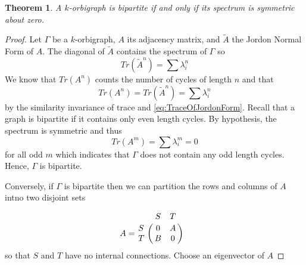 \documentclass[12pt]{article}
\theoremstyle{plain}
\newtheorem{theorem}{Theorem}
\theoremstyle{definition}
\theoremstyle{remark}
\begin{document}
    \begin{theorem}\label{thm:BipartiteSymmetry}
      A $k$-orbigraph is bipartite if and only if its spectrum is symmetric about zero.
    \end{theorem}
    \begin{proof}
      Let $\Gamma$ be a $k$-orbigraph, $A$ its adjacency matrix, and $\tilde{A}$ the Jordon Normal Form of $A$. The diagonal of $\tilde{A}$ contains the spectrum of $\Gamma$ so
        \begin{equation} \label{eq:TraceOfJordonForm}
          Tr(\tilde{A}^n) = \sum \lambda_i^n
        \end{equation}
      We know that $Tr(A^n)$ counts the number of cycles of length $n$ and that
        \begin{equation*}
          Tr(A^n) = Tr(\tilde{A}^n) = \sum \lambda_i^n
        \end{equation*}
      by the similarity invariance of trace and \ref{eq:TraceOfJordonForm}. Recall that a graph is bipartite if it contains only even length cycles. By hypothesis, the spectrum is symmetric and thus
        \begin{equation*}
          Tr(A^m) = \sum \lambda_i^m = 0
        \end{equation*}
      for all odd $m$ which indicates that $\Gamma$ does not contain any odd length cycles. Hence, $\Gamma$ is bipartite.

      Conversely, if $\Gamma$ is bipartite then we can partition the rows and columns of $A$ intno two disjoint sets

      $$
    A = 
      \bordermatrix {
          & S & T  \cr
        S & 0 & A  \cr
        T & B & 0
      } \ \ 
      $$
      so that $S$ and $T$ have no internal connections. Choose an eigenvector of $A$


\end{proof}
\end{document}
